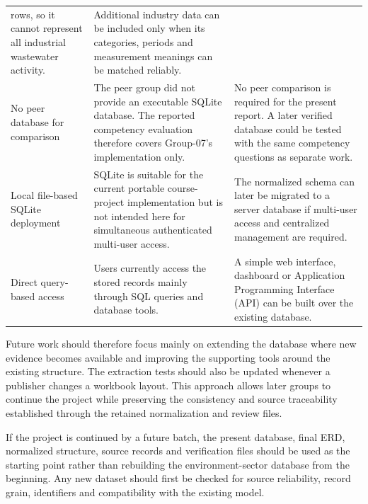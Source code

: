 \begin{longtable}{L{0.20\textwidth}L{0.32\textwidth}L{0.32\textwidth}}
rows, so it cannot represent all industrial wastewater activity. &
Additional industry data can be included only when its categories, periods and
measurement meanings can be matched reliably. \\
No peer database for comparison &
The peer group did not provide an executable SQLite database. The reported
competency evaluation therefore covers Group-07's implementation only. &
No peer comparison is required for the present report. A later verified
database could be tested with the same competency questions as separate work. \\
Local file-based SQLite deployment &
SQLite is suitable for the current portable course-project implementation but
is not intended here for simultaneous authenticated multi-user access. &
The normalized schema can later be migrated to a server database if multi-user
access and centralized management are required. \\
Direct query-based access &
Users currently access the stored records mainly through SQL queries and
database tools. &
A simple web interface, dashboard or Application Programming Interface (API)
can be built over the existing database. \\
\end{longtable}

\vspace{-24pt}
\begingroup{}
Future work should therefore focus mainly on extending the database where new
evidence becomes available and improving the supporting tools around the
existing structure. The extraction tests should also be updated whenever a
publisher changes a workbook layout. This approach allows later groups to
continue the project while preserving the consistency and source traceability
established through the retained normalization and review files.

If the project is continued by a future batch, the present database, final ERD,
normalized structure, source records and verification files should be used as
the starting point rather than rebuilding the environment-sector database from
the beginning. Any new dataset should first be checked for source reliability,
record grain, identifiers and compatibility with the existing model.
\endgroup
